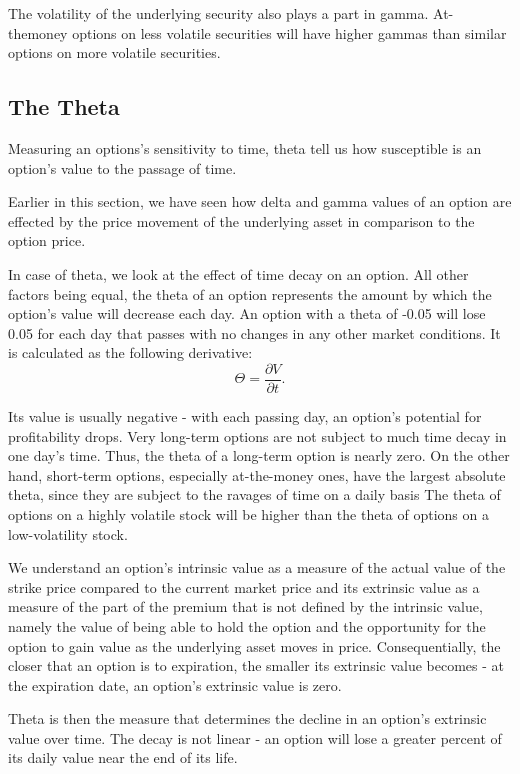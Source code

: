 \documentclass[a4paper, 12pt]{article}
\theoremstyle{definition}
\theoremstyle{plain}
\theoremstyle{definition}
\begin{document}
The volatility of the underlying security also plays a part in gamma. 
At-themoney options on less volatile securities will have higher gammas than similar options
on more volatile securities. 

\subsection{The Theta}

Measuring an options's sensitivity to time, 
theta tell us how susceptible is an option's value 
to the passage of time. 

Earlier in this section, we have seen how delta and gamma
values of an option are effected by the price movement 
of the underlying asset in comparison to the option price.

In case of theta, we look at the effect of time decay 
on an option. All other factors being equal, the theta of 
an option represents the amount by which the option's value 
will decrease each day. 
An option with a theta of -0.05 will lose 0.05 for each day that passes
with no changes in any other market conditions.
It is calculated as the following 
derivative:
$$
\Theta = \frac{\partial V}{\partial t}.
$$

Its value is usually negative - with each passing day, 
an option's potential for profitability drops.
Very long-term options are not subject to much time decay in one day's time.
Thus, the theta of a long-term option is nearly zero. On the other hand, short-term
options, especially at-the-money ones, have the largest absolute theta, since they are
subject to the ravages of time on a daily basis
The theta of options on a highly volatile
stock will be higher than the theta of options on a low-volatility stock.

We understand an option's intrinsic value as a measure 
of the actual value of the strike price compared to the 
current market price and its extrinsic value as a measure 
of the part of the premium that is not defined by 
the intrinsic value, namely the value of being able to 
hold the option and the opportunity for the option to gain 
value as the underlying asset moves in price. Consequentially,
the closer that an option is to expiration, the smaller 
its extrinsic value becomes - at the expiration date, 
an option's extrinsic value is zero.

Theta is then the measure that determines the decline in 
an option's extrinsic value over time.
The decay is not linear - an option will lose a greater percent of its daily value
near the end of its life. 
\end{document}

